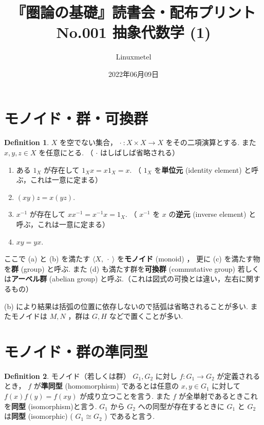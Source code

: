\documentclass[paper=b4, landscape, twocolumn, column_gap=2zw, head_space=15mm, foot_space=15mm, font_size=5pt, jafontscale=0.9, line_length=40zw]{jlreq}
\title{『圏論の基礎』読書会・配布プリント No.001 抽象代数学 (1)}
\author{Linuxmetel}
\date{2022年06月09日}
\theoremstyle{definition}
\newtheorem{definition}{Definition}[section]
\begin{document}


 \section{モノイド・群・可換群}
 \begin{definition}
 $X$ を空でない集合， $\cdot\ : X \times X \rightarrow X$ をその二項演算とする. また $x, y, z \in X$ を任意にとる. （ $\cdot$ はしばしば省略される）
  \begin{enumerate}
   \item ある $1_X$ が存在して $1_Xx = x1_X=x$. （ $1_X$ を\textbf{単位元} (identity element) と呼ぶ，これは一意に定まる）
   \item $(xy)z = x(yz)$.
   \item $x^{-1}$ が存在して $xx^{-1} = x^{-1}x=1_X$. （ $x^{-1}$ を $x$ の\textbf{逆元} (inverse element) と呼ぶ，これは一意に定まる）
   \item $xy = yx$.
  \end{enumerate}

  ここで (a) と (b) を満たす $\langle X, \ \cdot\ \rangle$ を\textbf{モノイド} (monoid) ， 更に (c) を満たす物を\textbf{群} (group) と呼ぶ. また (d) も満たす群を\textbf{可換群} (commutative group) 若しくは\textbf{アーベル群} (abelian group) と呼ぶ.（これは図式の可換とは違い，左右に関するもの）

  (b) により結果は括弧の位置に依存しないので括弧は省略されることが多い. またモノイドは $M, N$ ，群は $G, H$ などで置くことが多い.
 \end{definition}
 

 \section{モノイド・群の準同型}
 \begin{definition}
  モノイド（若しくは群） $G_1, G_2$ に対し $ f : G_1 \rightarrow G_2$ が定義されるとき， $f$ が\textbf{準同型} (homomorphism) であるとは任意の $x, y ∈ G_1$ に対して $f(x)f(y)=f(xy)$ が成り立つことを言う. また $f$ が全単射であるときこれを\textbf{同型} (isomorphism)と言う. $G_1$ から $G_2$ への同型が存在するときに $G_1$ と $G_2$ は\textbf{同型} (isomorphic) ( $G_1 \cong G_2$ ) であると言う.
 \end{definition}
\end{document}
